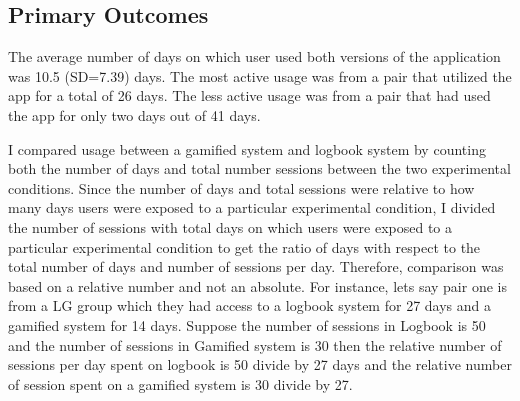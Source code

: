 \subsection{Primary Outcomes}
The average number of days on which user used both versions of the application was 10.5 (SD=7.39) days. The most active usage was from a pair that utilized the app for a total of 26 days. The less active usage was from a pair that had used the app for only two days out of 41 days. 

I compared usage between a gamified system and logbook system by counting both the number of days and total number sessions between the two experimental conditions. Since the number of days and total sessions were relative to how many days users were exposed to a particular experimental condition, I divided the number of sessions with total days on which users were exposed to a particular experimental condition to get the ratio of days with respect to the total number of days and number of sessions per day. Therefore, comparison was based on a relative number and not an absolute. For instance, lets say pair one is from a LG group which they had access to a logbook system for 27 days and a gamified system for 14 days. Suppose the number of sessions in Logbook is 50 and the number of sessions in Gamified system is 30 then the relative number of sessions per day spent on logbook is 50 divide by 27 days and the relative number of session spent on  a gamified system is 30 divide by 27. 
 
